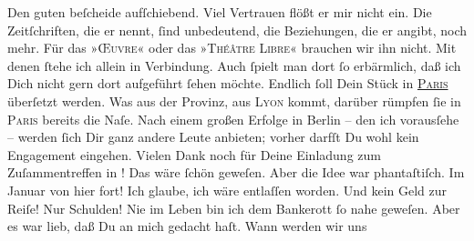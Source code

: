\begin{ledgroupsized}[t]{13cm}
           \pstart
           Den guten \label{K_L02762-4v}\label{K_L02762-4h} beſcheide aufſchiebend. Viel Vertrauen flößt er mir nicht ein. Die
               Zeitſchriften, die er  nennt, ſind unbedeutend,
               die  Beziehungen, die er angibt, noch mehr. Für
               das »\textsc{Œuvre}« oder das »\textsc{Théâtre Libre}« brauchen wir ihn nicht. Mit denen ſtehe ich allein in Verbindung. Auch ſpielt
               man dort ſo erbärmlich, daß ich Dich nicht gern dort aufgeführt ſehen {\pb}möchte. Endlich ſoll Dein Stück in \textsc{\uline{Paris}} überſetzt werden. Was aus der Provinz, aus \textsc{Lyon} kommt, darüber rümpfen ſie in \textsc{Paris} bereits die Naſe. Nach einem großen Erfolge in Berlin – den ich \strikeout{\textcolor{gray}{×}} vorausſehe – werden ſich Dir ganz andere Leute anbieten; vorher darfſt Du wohl
               kein Engagement eingehen.\pend
           \pstart
           {\pb}Vielen Dank noch für Deine Einladung zum
               Zuſammentreffen in \label{K_L02762-5v}\label{K_L02762-5h}! Das wäre ſchön
               geweſen. Aber die Idee war phantaſtiſch. Im Januar von
               hier fort! Ich glaube, ich wäre entlaſſen worden. Und kein Geld zur Reiſe! Nur
               Schulden! Nie im Leben bin ich dem Bankerott ſo nahe geweſen. Aber es war lieb, daß
               Du an mich gedacht haſt. Wann {\pb}werden wir uns

\end{ledgroupsized}
